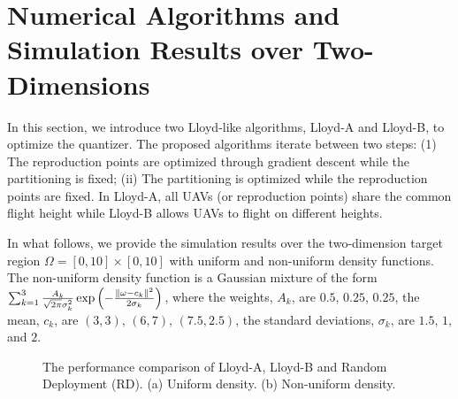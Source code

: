 \documentclass[smallabstract,smallcaptions]{dccpaper}
\begin{document}
\section{Numerical Algorithms and Simulation Results over Two-Dimensions}
%
In this section, we introduce two Lloyd-like algorithms, Lloyd-A and Lloyd-B, to optimize the quantizer. The proposed
algorithms iterate between two steps: (1) The reproduction points are optimized through gradient descent while the
partitioning is fixed; (ii) The partitioning is optimized while the reproduction points are fixed.  In Lloyd-A, all UAVs
(or reproduction points) share the common flight height while Lloyd-B allows UAVs to flight on different heights.

In what follows, we provide the simulation results over the two-dimension target region $\Omega=[0,10]\times[0,10]$ with
uniform and non-uniform density functions.  The non-uniform density function is a Gaussian mixture of the form
$\sum_{k=1}^{3}\frac{A_k}{\sqrt{2\pi}\sigma^2_k}\exp{\left(-\frac{\|\ensuremath{\omega}-c_k\|^2}{2\sigma_k}\right)}$, where the
weights, $A_k$, are $0.5$, $0.25$, $0.25$, the mean, $c_k$, are $(3,3)$, $(6,7)$, $(7.5,2.5)$, the standard deviations,
$\sigma_k$, are  $1.5$, $1$, and $2$.


\begin{figure}[!htb]
\setlength\abovecaptionskip{0pt}
\setlength\belowcaptionskip{0pt}
\centering
{}
\hfil
{}
\captionsetup{justification=justified}
\caption{\small{The performance comparison of Lloyd-A, Lloyd-B and Random Deployment (RD). 
(a) Uniform density. (b) Non-uniform density.}}
\label{Distortion}
\end{figure}
\end{document}
